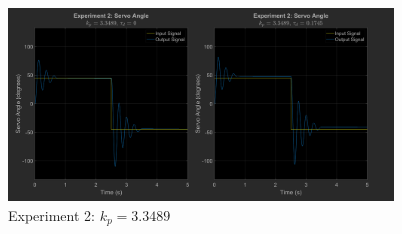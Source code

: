 \documentclass[12pt]{article}
\begin{document}
\begin{figure}[h]
    \centering
    \includegraphics[width=0.91\textwidth]{exp2_kp3.3489}
    \caption{Experiment 2: $k_p = 3.3489$}
\end{figure}

\clearpage
\end{document}
